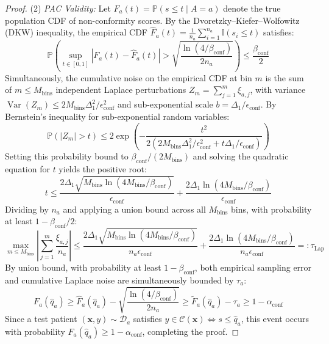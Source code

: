 \documentclass[3p,12pt]{elsarticle}
\theoremstyle{plain}
\theoremstyle{definition}
\begin{document}
\begin{proof}
(2) \emph{PAC Validity:} Let $F_a(t) = \mathbb{P}(s \le t \mid A=a)$ denote the true population CDF of non-conformity scores. By the Dvoretzky--Kiefer--Wolfowitz (DKW) inequality, the empirical CDF $\hat{F}_a(t) = \frac{1}{n_a} \sum_{i=1}^{n_a} \mathbb{I}(s_i \le t)$ satisfies:
\begin{equation}
    \mathbb{P}\left(\sup_{t \in [0, 1]} |F_a(t) - \hat{F}_a(t)| > \sqrt{\frac{\ln(4/\beta_{\text{conf}})}{2 n_a}}\right) \le \frac{\beta_{\text{conf}}}{2}
\end{equation}
Simultaneously, the cumulative noise on the empirical CDF at bin $m$ is the sum of $m \le M_{\text{bins}}$ independent Laplace perturbations $Z_m = \sum_{j=1}^m \xi_{a, j}$, with variance $\operatorname{Var}(Z_m) \le 2 M_{\text{bins}} \Delta_1^2 / \epsilon_{\text{conf}}^2$ and sub-exponential scale $b = \Delta_1/\epsilon_{\text{conf}}$. By Bernstein's inequality for sub-exponential random variables:
\begin{equation}
    \mathbb{P}\left(|Z_m| > t\right) \le 2 \exp\left( - \frac{t^2}{2 (2 M_{\text{bins}} \Delta_1^2 / \epsilon_{\text{conf}}^2 + t \Delta_1 / \epsilon_{\text{conf}})} \right)
\end{equation}
Setting this probability bound to $\beta_{\text{conf}} / (2 M_{\text{bins}})$ and solving the quadratic equation for $t$ yields the positive root:
\begin{equation}
    t \le \frac{2 \Delta_1 \sqrt{M_{\text{bins}} \ln(4M_{\text{bins}}/\beta_{\text{conf}})}}{\epsilon_{\text{conf}}} + \frac{2 \Delta_1 \ln(4M_{\text{bins}}/\beta_{\text{conf}})}{\epsilon_{\text{conf}}}
\end{equation}
Dividing by $n_a$ and applying a union bound across all $M_{\text{bins}}$ bins, with probability at least $1 - \beta_{\text{conf}}/2$:
\begin{equation}
    \max_{m \le M_{\text{bins}}} \left| \sum_{j=1}^m \frac{\xi_{a, j}}{n_a} \right| \le \frac{2 \Delta_1 \sqrt{M_{\text{bins}} \ln(4M_{\text{bins}}/\beta_{\text{conf}})}}{n_a \epsilon_{\text{conf}}} + \frac{2 \Delta_1 \ln(4M_{\text{bins}}/\beta_{\text{conf}})}{n_a \epsilon_{\text{conf}}} =: \tau_{\text{Lap}}
\end{equation}
By union bound, with probability at least $1 - \beta_{\text{conf}}$, both empirical sampling error and cumulative Laplace noise are simultaneously bounded by $\tau_a$:
\begin{equation}
    F_a(\hat{q}_a) \ge \hat{F}_a(\hat{q}_a) - \sqrt{\frac{\ln(4/\beta_{\text{conf}})}{2 n_a}} \ge \widetilde{F}_a(\hat{q}_a) - \tau_a \ge 1 - \alpha_{\text{conf}}
\end{equation}
Since a test patient $(\mathbf{x}, y) \sim \mathcal{D}_a$ satisfies $y \in \mathcal{C}(\mathbf{x}) \iff s \le \hat{q}_a$, this event occurs with probability $F_a(\hat{q}_a) \ge 1 - \alpha_{\text{conf}}$, completing the proof.
\end{proof}
\end{document}

